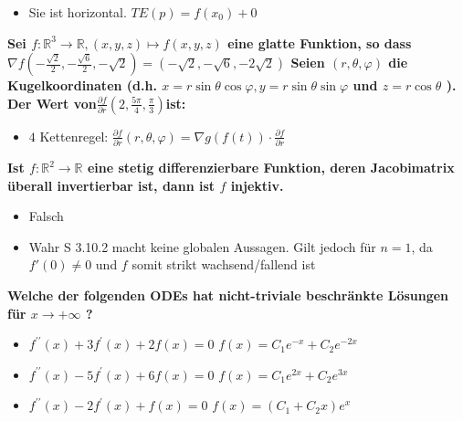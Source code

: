 \begin{flushleft}
\begin{itemize}[leftmargin = *]
\item[\textcolor{green}{W}] Sie ist horizontal. \textcolor{Emerald}{$TE(p)=f\left(x_0\right)+0$}
\end{itemize}



\textbf{ Sei $f: \mathbb{R}^3 \rightarrow \mathbb{R},(x, y, z) \mapsto f(x, y, z)$ eine glatte Funktion, so dass$
\nabla f\left(-\frac{\sqrt{2}}{2},-\frac{\sqrt{6}}{2},-\sqrt{2}\right)=(-\sqrt{2},-\sqrt{6},-2 \sqrt{2})$ Seien $(r, \theta, \varphi)$ die Kugelkoordinaten (d.h. $x=r \sin \theta \cos \varphi, y=r \sin \theta \sin \varphi$ und $z=r \cos \theta$ ). Der Wert von$\frac{\partial f}{\partial r}\left(2, \frac{5 \pi}{4}, \frac{\pi}{3}\right)$ist:}

\begin{itemize}[leftmargin = *]
\item[\textcolor{green}{W}] $4$
 \textcolor{Emerald}{Kettenregel: $\frac{\partial f}{\partial r}(r, \theta, \varphi) = \nabla g(f(t)) \cdot \frac{\partial f}{\partial r}$}

\end{itemize}








\textbf{Ist $f: \mathbb{R}^2 \rightarrow \mathbb{R}$ eine stetig differenzierbare Funktion, deren Jacobimatrix überall invertierbar ist, dann ist $f$ injektiv. }

\begin{itemize}[leftmargin = *]
\item[\textcolor{green}{W}] Falsch 
\item[\textcolor{red}{F}] Wahr  \textcolor{Emerald}{S 3.10.2 macht keine globalen Aussagen. Gilt jedoch für $n=1$, da $f'(0)\neq 0$ und $f$ somit strikt wachsend/fallend ist}

\end{itemize}




\textbf{Welche der folgenden ODEs hat nicht-triviale beschränkte Lösungen für $x \rightarrow+\infty$ ?}

\begin{itemize}[leftmargin = *]
\item[\textcolor{green}{W}] $f^{\prime \prime}(x)+3 f^{\prime}(x)+2 f(x)=0$ \textcolor{Emerald}{$f(x)=C_1 e^{-x}+C_2 e^{-2 x}$}
\item[\textcolor{red}{F}]  $f^{\prime \prime}(x)-5 f^{\prime}(x)+6 f(x)=0$ \textcolor{Emerald}{$f(x)=C_1 e^{2 x}+C_2 e^{3 x}$}
\item[\textcolor{red}{F}]  $f^{\prime \prime}(x)-2 f^{\prime}(x)+f(x)=0$   \textcolor{Emerald}{$f(x)=\left(C_1+C_2 x\right) e^x$}
\end{itemize}





\end{flushleft}

